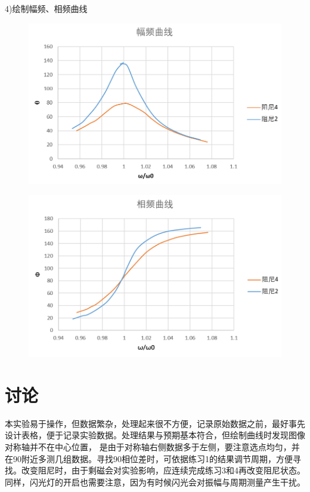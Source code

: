\documentclass[UTF8]{ctexart}
\begin{document}
        4)绘制幅频、相频曲线
        \begin{figure}[!htbp]
            \centering
            \includegraphics[scale=1.0]{sevevth.png}
        \end{figure}
        \begin{figure}[!htbp]
            \centering
            \includegraphics[scale=1.0]{sixth.png}
        \end{figure}
    \section{讨论}
    本实验易于操作，但数据繁杂，处理起来很不方便，记录原始数据之前，最好事先设计表格，便于记录实验数据。处理结果与预期基本符合，但绘制曲线时发现图像对称轴并不在中心位置，
    是由于对称轴右侧数据多于左侧，要注意选点均匀，并在90附近多测几组数据。寻找90相位差时，可依据练习1的结果调节周期，方便寻找。改变阻尼时，由于剩磁会对实验影响，应连续完成练习3和4再改变阻尼状态。
    同样，闪光灯的开启也需要注意，因为有时候闪光会对振幅与周期测量产生干扰。
\end{document}
